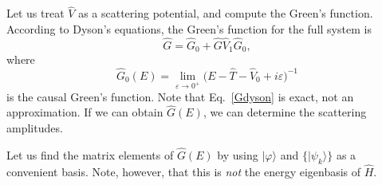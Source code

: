 \documentclass[pra,12pt]{revtex4-2}
\begin{document}
Let us treat $\hat{V}$ as a scattering potential, and compute the
Green's function.  According to Dyson's equations, the Green's
function for the full system is
\begin{equation}
  \hat{G} = \hat{G}_0 + \hat{G} \hat{V}_1 \hat{G}_0,
  \label{Gdyson}
\end{equation}
where
\begin{equation}
  \hat{G}_0(E) = \lim_{\varepsilon\rightarrow0^+}
  \Big(E - \hat{T} - \hat{V}_0 + i\varepsilon\Big)^{-1}
\end{equation}
is the causal Green's function.  Note that Eq.~\eqref{Gdyson} is
exact, not an approximation.  If we can obtain $\hat{G}(E)$, we can
determine the scattering amplitudes.

Let us find the matrix elements of $\hat{G}(E)$ by using
$|\varphi\rangle$ and $\{|\psi_k\rangle\}$ as a convenient basis.
Note, however, that this is \textit{not} the energy eigenbasis of
$\hat{H}$.
\end{document}
